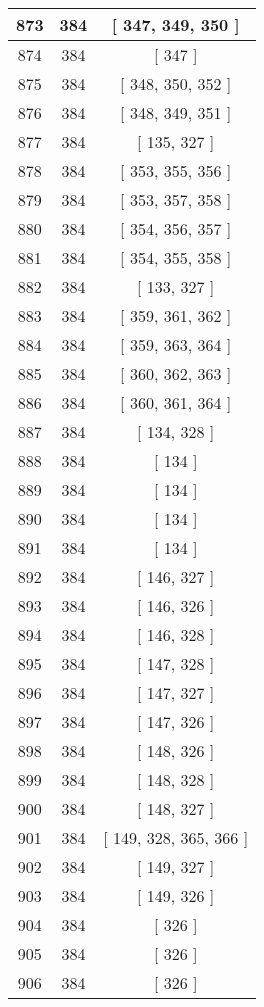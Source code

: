 \begin{center}
\begin{longtable}[H]{|| c c c ||}
873 & 384 & [ 347, 349, 350 ] \\ 
\hline
874 & 384 & [ 347 ] \\ 
\hline
875 & 384 & [ 348, 350, 352 ] \\ 
\hline
876 & 384 & [ 348, 349, 351 ] \\ 
\hline
877 & 384 & [ 135, 327 ] \\ 
\hline
878 & 384 & [ 353, 355, 356 ] \\ 
\hline
879 & 384 & [ 353, 357, 358 ] \\ 
\hline
880 & 384 & [ 354, 356, 357 ] \\ 
\hline
881 & 384 & [ 354, 355, 358 ] \\ 
\hline
882 & 384 & [ 133, 327 ] \\ 
\hline
883 & 384 & [ 359, 361, 362 ] \\ 
\hline
884 & 384 & [ 359, 363, 364 ] \\ 
\hline
885 & 384 & [ 360, 362, 363 ] \\ 
\hline
886 & 384 & [ 360, 361, 364 ] \\ 
\hline
887 & 384 & [ 134, 328 ] \\ 
\hline
888 & 384 & [ 134 ] \\ 
\hline
889 & 384 & [ 134 ] \\ 
\hline
890 & 384 & [ 134 ] \\ 
\hline
891 & 384 & [ 134 ] \\ 
\hline
892 & 384 & [ 146, 327 ] \\ 
\hline
893 & 384 & [ 146, 326 ] \\ 
\hline
894 & 384 & [ 146, 328 ] \\ 
\hline
895 & 384 & [ 147, 328 ] \\ 
\hline
896 & 384 & [ 147, 327 ] \\ 
\hline
897 & 384 & [ 147, 326 ] \\ 
\hline
898 & 384 & [ 148, 326 ] \\ 
\hline
899 & 384 & [ 148, 328 ] \\ 
\hline
900 & 384 & [ 148, 327 ] \\ 
\hline
901 & 384 & [ 149, 328, 365, 366 ] \\ 
\hline
902 & 384 & [ 149, 327 ] \\ 
\hline
903 & 384 & [ 149, 326 ] \\ 
\hline
904 & 384 & [ 326 ] \\ 
\hline
905 & 384 & [ 326 ] \\ 
\hline
906 & 384 & [ 326 ] \\ 

\end{longtable}
\end{center}

